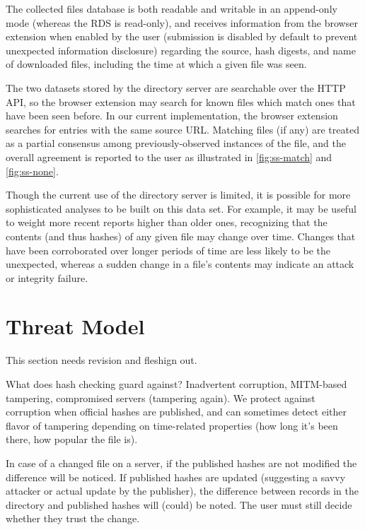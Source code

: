 \documentclass[letterpaper,twocolumn,10pt]{article}
\begin{document}
The collected files database is both readable and writable in an append-only mode
(whereas the RDS is read-only), and receives information from the browser extension
when enabled by the user (submission is disabled by default to prevent unexpected
information disclosure) regarding the source, hash digests, and name of downloaded
files, including the time at which a given file was seen.

The two datasets stored by the directory server are searchable over the HTTP
API, so the browser extension may search for known files which match ones
that have been seen before. In our current implementation, the browser extension
searches for entries with the same source URL. Matching files (if any) are
treated as a partial consensus among previously-observed instances of the file,
and the overall agreement is reported to the user as illustrated in \autoref{fig:ss-match}
and \autoref{fig:ss-none}.

Though the current use of the directory server is limited, it is possible for more
sophisticated analyses to be built on this data set. For example, it may be
useful to weight more recent reports higher than older ones, recognizing
that the contents (and thus hashes) of any given file may change over time.
Changes that have been corroborated over longer periods of time are less
likely to be the unexpected, whereas a sudden change in a file's contents may indicate
an attack or integrity failure.

\section{Threat Model}

This section needs revision and fleshign out.

What does hash checking guard against? Inadvertent corruption, MITM-based tampering, compromised servers (tampering again). We protect against corruption when official hashes are published, and can sometimes detect either flavor of tampering depending on time-related properties (how long it’s been there, how popular the file is).

In case of a changed file on a server, if the published hashes are not modified the difference will be noticed. If published hashes are updated (suggesting a savvy attacker or actual update by the publisher), the difference between records in the directory and published hashes will (could) be noted. The user must still decide whether they trust the change.
\end{document}
